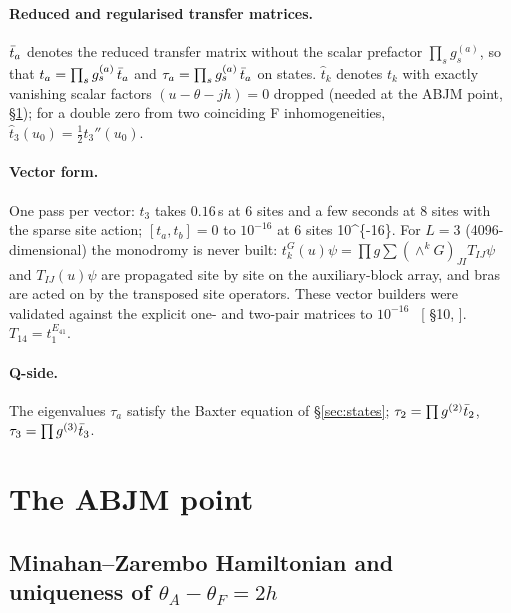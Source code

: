 \paragraph{Reduced and regularised transfer matrices.} $\bar t_a$ denotes the reduced transfer matrix without the scalar
prefactor $\prod_sg^{(a)}_s$, so that $t_a=\prod_sg_s^{(a)}\,\bar t_a$ and $\tau_a=\prod_sg^{(a)}_s\,\bar t_a$ on states. $\hat t_k$
denotes $t_k$ with exactly vanishing scalar factors $(u-\theta-jh)=0$ dropped (needed at the ABJM point,
\S\ref{sec:abjm}); for a double zero from two coinciding F inhomogeneities, $\hat t_3(u_0)=\tfrac12t_3''(u_0)$.

\paragraph{Vector form.} One pass per vector: $t_3$ takes $0.16$\,s at 6 sites and a few seconds at 8 sites with the sparse
site action; $[t_a,t_b]=0$ to $10^{-16}$ at 6 sites \num{10^{-16}}. For $L=3$ (4096-dimensional) the monodromy is never built:
$t_k^G(u)\psi=\prod g\sum(\wedge^kG)_{JI}T_{IJ}\psi$ and $T_{IJ}(u)\psi$ are propagated site by site on the
auxiliary-block array, and bras are acted on by the transposed site operators. These vector builders were validated against
the explicit one- and two-pair matrices to $10^{-16}$ \ex\ [ \S10,
]. $T_{14}=t_1^{E_{41}}$.

\paragraph{Q-side.} The eigenvalues $\tau_a$ satisfy the Baxter equation of \S\ref{sec:states}; $\tau_2=\prod g^{(2)}\bar t_2$,
$\tau_3=\prod g^{(3)}\bar t_3$.

\section{The ABJM point}\label{sec:abjm}

\subsection{Minahan--Zarembo Hamiltonian and uniqueness of $\theta_A-\theta_F=2h$}\label{sec:abjm-mz}

